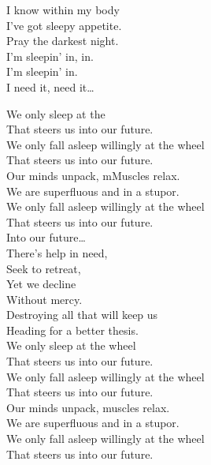 I know within my body \\
I've got sleepy appetite. \\
Pray the darkest night. \\
I'm sleepin' in, in. \\
I'm sleepin' in. \\

I need it, need it… \\





We only sleep at the  \\
That steers us into our future. \\
We only fall asleep willingly at the wheel \\
That steers us into our future. \\

Our minds unpack, mMuscles relax. \\
We are superfluous and in a stupor. \\
We only fall asleep willingly at the wheel \\
That steers us into our future. \\

Into our future… \\

There's help in need, \\
Seek to retreat, \\
Yet we decline \\
Without mercy. \\
Destroying all that will keep us \\
Heading for a better thesis. \\

We only sleep at the wheel \\
That steers us into our future. \\
We only fall asleep willingly at the wheel \\
That steers us into our future. \\

Our minds unpack, muscles relax. \\
We are superfluous and in a stupor. \\
We only fall asleep willingly at the wheel \\
That steers us into our future. \\

